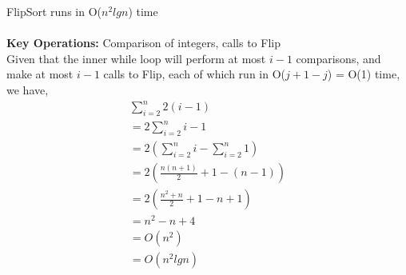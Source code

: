 \documentclass[12pt]{article}
\newenvironment{lemma}[2][Lemma]{\begin{trivlist}
\item[\hskip \labelsep {\bfseries #1}\hskip \labelsep {\bfseries #2.}]}{\end{trivlist}}
\newenvironment{question}[2][Question]{\begin{trivlist}
\item[\hskip \labelsep {\bfseries #1}\hskip \labelsep {\bfseries #2.}]}{\end{trivlist}}
\begin{document}
\begin{question}{1 (b)}
  \begin{lemma}{1.5} FlipSort runs in O($n^{2}lgn$) time \\ \\
    \textbf{Key Operations:} Comparison of integers, calls to Flip \\
    Given that the inner while loop will perform at most $i - 1$ comparisons,
    and make at most $i - 1$ calls to Flip, each of which run in O($j + 1 - j$) = O(1) time,
    we have,
    \begin{align*}
      & \sum_{i=2}^{n} 2(i-1) &\\
      & = 2\sum_{i=2}^{n}i-1 &\\
      & = 2(\sum_{i=2}^{n}i - \sum_{i=2}^{n}1) &\\
      & = 2(\frac{n(n + 1)}{2} + 1 - (n - 1))&\\
      & = 2(\frac{n^{2} + n}{2} + 1 - n  + 1)&\\
      & = n^{2} - n + 4 & \\
      & = O(n^{2}) & \\
      & = O(n^{2}lgn) &
    \end{align*}
  \end{lemma}
\end{question}
\end{document}
